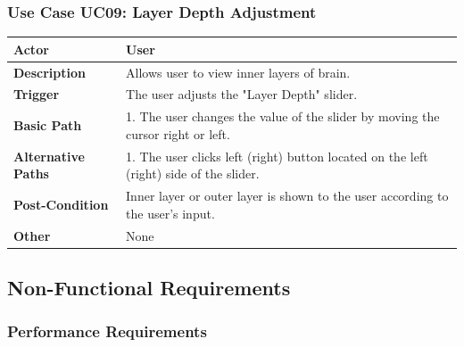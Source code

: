 \documentclass[paper=a4, fontsize=12pt]{scrartcl}	%
\numberwithin{equation}{section}		%
\numberwithin{figure}{section}			%
\numberwithin{table}{section}				%
\newcommand{\skipsubsection}[0]{\vspace{1cm}}
\begin{document}
    \subsubsection{Use Case UC09: Layer Depth Adjustment}
     \begin{center}
    \end{center}
    	\begin{center}
        	\begin{tabular}{ | p{4cm} | p{9cm} |}
            	\hline
                	\textbf{Actor} & User\\ \hline
                    \textbf{Description} & Allows user to view inner layers of brain.\\ \hline
                    \textbf{Trigger} & The user adjusts the "Layer Depth" slider.\\ \hline
                    \textbf{Basic Path} & 1. The user changes the value of the slider by moving the cursor right or left.\\ \hline
                    \textbf{Alternative Paths} & 1. The user clicks left (right) button located on the left (right) side of the slider.\\ \hline
                    \textbf{Post-Condition} & Inner layer or outer layer is shown to the user according to the user's input.\\ \hline
                    \textbf{Other} & None\\
                \hline
            \end{tabular}
        \end{center}
    \skipsubsection
    
    \skipsubsection 
        
	\subsection{Non-Functional Requirements}
	\subsubsection{Performance Requirements}
\end{document}
